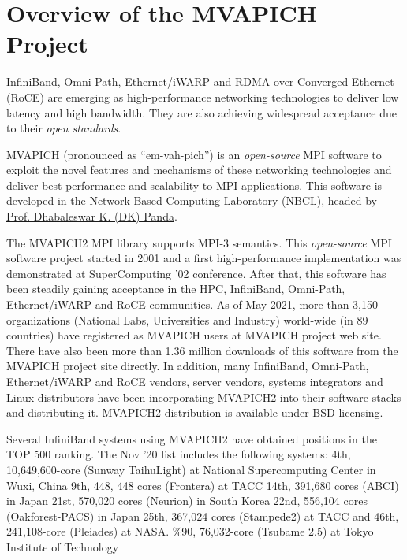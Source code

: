 \section{Overview of the MVAPICH Project}

InfiniBand, Omni-Path, Ethernet/iWARP and RDMA over 
Converged Ethernet (RoCE) are
emerging as high-performance networking technologies to deliver low latency and
high bandwidth.  They are also achieving widespread acceptance due to their {\em
open standards}.

MVAPICH (pronounced as ``em-vah-pich'') is an {\em open-source} MPI software to
exploit the novel features and mechanisms of these networking technologies and
deliver best performance and scalability to MPI applications.  This software is
developed in the \href{http://nowlab.cse.ohio-state.edu} {Network-Based
Computing Laboratory (NBCL)}, headed by
\href{http://www.cse.ohio-state.edu/~panda} {Prof. Dhabaleswar K. (DK) Panda}.

The MVAPICH2 MPI library supports MPI-3 semantics.  This {\em open-source} MPI
software project started in 2001 and a first high-performance implementation was
demonstrated at SuperComputing '02 conference.  After that, this software has
been steadily gaining acceptance in the HPC, InfiniBand, Omni-Path, 
Ethernet/iWARP and
RoCE communities. As of  May 2021, more than 3,150
organizations (National Labs, Universities and Industry) world-wide (in 89 
countries) have registered as MVAPICH users at MVAPICH project web site. There
have also been more than 1.36 million downloads of this 
software from the MVAPICH
project site directly.  In addition, many InfiniBand, Omni-Path, Ethernet/iWARP 
and 
RoCE vendors, server vendors, systems integrators and Linux distributors have
been incorporating MVAPICH2 into their software stacks and distributing it. 
MVAPICH2 distribution is available under BSD licensing.

Several InfiniBand systems using MVAPICH2 have obtained positions in 
the TOP 500
ranking.  The Nov '20 list includes the following systems: 
4th, 10,649,600-core (Sunway TaihuLight) at National Supercomputing Center in
Wuxi, China
9th, 448, 448 cores (Frontera) at TACC
14th, 391,680 cores (ABCI) in Japan
21st, 570,020 cores (Neurion) in South Korea
22nd, 556,104 cores (Oakforest-PACS) in Japan
25th, 367,024 cores (Stampede2) at TACC
and 46th, 241,108-core (Pleiades) at NASA.
\%90, 76,032-core (Tsubame 2.5) at Tokyo Institute of Technology

